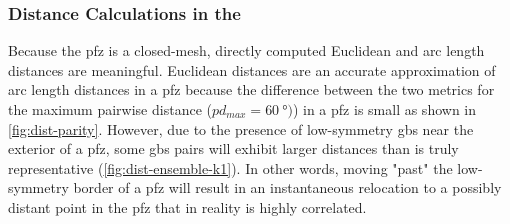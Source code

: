 \documentclass[preprint,12pt]{elsarticle}
\begin{document}

\subsubsection{Distance Calculations in the }
\label{sec:methods:distancepFZ}

Because the \gls{pfz} is a closed-mesh, directly computed Euclidean and arc length distances are meaningful. Euclidean distances are an accurate approximation of arc length distances in a \gls{pfz} because the difference between the two metrics for the maximum pairwise distance ($pd_{max} = \SI{60}{\degree})$) in a \gls{pfz} is small as shown in \cref{fig:dist-parity}. However, due to the presence of low-symmetry \glspl{gb} near the exterior of a \gls{pfz}, some \glspl{gb} pairs will exhibit larger distances than is truly representative (\cref{fig:dist-ensemble-k1}). In other words, moving "past" the low-symmetry border of a \gls{pfz} will result in an instantaneous relocation to a possibly distant point in the \gls{pfz} that in reality is highly correlated.
\end{document}
